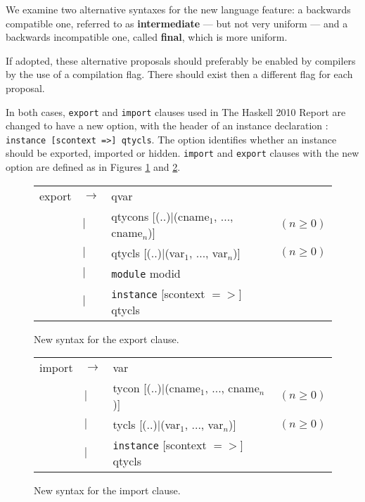 \documentclass[msc]{ppgccufmg}
\begin{document}
We examine two alternative syntaxes for the new language feature: a
backwards compatible one, referred to as \textbf{intermediate} --- but
not very uniform --- and a backwards incompatible one, called
\textbf{final}, which is more uniform.

If adopted, these alternative proposals should
preferably be enabled by compilers by the use of a compilation flag.  There
should exist then a different flag for each proposal.

In both cases, \texttt{export} and \texttt{import} clauses used in
The Haskell 2010 Report \citep[sections 5.2 and 5.3]{report} are
changed to have a new option, with the header of
an instance declaration \citep[section~4.3.2]{report}: \texttt{instance
  [scontext =>] qtycls}.  The option identifies whether an instance should be
exported, imported or hidden.  \texttt{import} and \texttt{export} clauses with the new option are defined as in
Figures \ref{export} and \ref{import}.

\begin{figure}
\caption{New syntax for the export clause.\label{export}}
\begin{tabular}{|l l l l|}
\hline
export & $\to$ & qvar &\\
& $|$ & qtycons [(..)$|$(cname$_1$, ..., cname$_n$)] & $(n \geq 0)$\\
& $|$ & qtycls [(..)$|$(var$_1$, ..., var$_n$)] & $(n \geq 0)$\\
& $|$ & \texttt{module} modid &\\
& $|$ & \texttt{instance} [scontext $=>$] qtycls &\\
\hline
\end{tabular}
\end{figure}

\begin{figure}
\caption{New syntax for the import clause.\label{import}}
\begin{tabular}{|l l l l|}
\hline
import & $\to$ & var &\\
& $|$ & tycon [(..)$|$(cname$_1$, ..., cname$_n$)] & $(n \geq 0)$\\
& $|$ & tycls [(..)$|$(var$_1$, ..., var$_n$)] & $(n \geq 0)$\\
& $|$ & \texttt{instance} [scontext $=>$] qtycls &\\
\hline
\end{tabular}
\end{figure}
\end{document}
